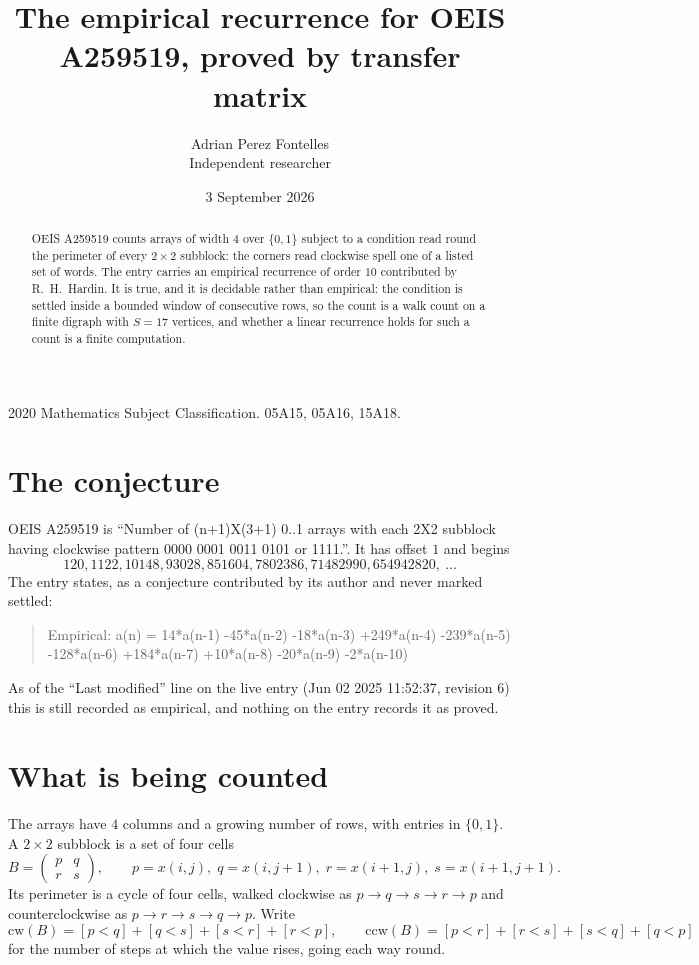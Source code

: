 \documentclass[11pt,a4paper]{article}
\title{The empirical recurrence for OEIS A259519, proved by transfer matrix}
\author{Adrian Perez Fontelles\\ \small Independent researcher}
\date{3 September 2026}
\theoremstyle{plain}
\theoremstyle{definition}
\begin{document}
\maketitle

\begin{abstract}
OEIS A259519 counts arrays of width $4$ over $\{0,1\}$ subject to a condition read round the
perimeter of every $2\times2$ subblock: the corners read clockwise spell one of a listed set of words. The entry carries an empirical recurrence of
order $10$ contributed by R.~H.~Hardin. It is true, and it is decidable rather than
empirical: the condition is settled inside a bounded window of consecutive rows, so the
count is a walk count on a finite digraph with $S=17$ vertices, and whether a linear
recurrence holds for such a count is a finite computation.
\end{abstract}

\noindent\small 2020 Mathematics Subject Classification. 05A15, 05A16, 15A18.\normalsize

\section{The conjecture}

OEIS A259519 is ``Number of (n+1)X(3+1) 0..1 arrays with each 2X2 subblock having clockwise pattern 0000 0001 0011 0101 or 1111.''. It has offset $1$ and begins
\[
120, 1122, 10148, 93028, 851604, 7802386, 71482990, 654942820,\ \dots
\]
The entry states, as a conjecture contributed by its author and never marked settled:
\begin{quote}
Empirical: a(n) = 14*a(n-1) -45*a(n-2) -18*a(n-3) +249*a(n-4) -239*a(n-5) -128*a(n-6) +184*a(n-7) +10*a(n-8) -20*a(n-9) -2*a(n-10)
\end{quote}
As of the ``Last modified'' line on the live entry (Jun 02 2025 11:52:37, revision 6) this is still
recorded as empirical, and nothing on the entry records it as proved.

\section{What is being counted}

The arrays have $4$ columns and a growing number of rows, with entries in $\{0,1\}$. A
$2\times2$ subblock is a set of four cells
\[
B=\begin{pmatrix} p & q \\ r & s \end{pmatrix},
\qquad p=x(i,j),\; q=x(i,j+1),\; r=x(i+1,j),\; s=x(i+1,j+1).
\]
Its perimeter is a cycle of four cells, walked clockwise as $p\to q\to s\to r\to p$ and
counterclockwise as $p\to r\to s\to q\to p$. Write
\[
\mathrm{cw}(B)=[p<q]+[q<s]+[s<r]+[r<p],\qquad
\mathrm{ccw}(B)=[p<r]+[r<s]+[s<q]+[q<p]
\]
for the number of steps at which the value rises, going each way round.
\end{document}

